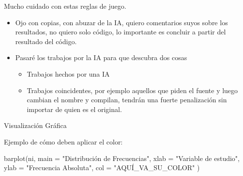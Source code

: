 \documentclass[
  ignorenonframetext,
]{beamer}
\newenvironment{Shaded}{\begin{snugshade}}{\end{snugshade}}
\newcommand{\AttributeTok}[1]{\textcolor[rgb]{0.40,0.45,0.13}{#1}}
\newcommand{\FunctionTok}[1]{\textcolor[rgb]{0.28,0.35,0.67}{#1}}
\newcommand{\NormalTok}[1]{\textcolor[rgb]{0.00,0.23,0.31}{#1}}
\newcommand{\StringTok}[1]{\textcolor[rgb]{0.13,0.47,0.30}{#1}}
\providecommand{\tightlist}{%
  \setlength{\itemsep}{0pt}\setlength{\parskip}{0pt}}
\begin{document}
\begin{frame}{Mucho cuidado con estas reglas de juego.}
\label{mucho-cuidado-con-estas-reglas-de-juego.}
\begin{tcolorbox}[enhanced jigsaw, opacitybacktitle=0.6, toprule=.15mm, opacityback=0, colbacktitle=quarto-callout-caution-color!10!white, colback=white, leftrule=.75mm, bottomrule=.15mm, colframe=quarto-callout-caution-color-frame, titlerule=0mm, coltitle=black, bottomtitle=1mm, breakable, rightrule=.15mm, toptitle=1mm, title=\textcolor{quarto-callout-caution-color}{\faFire}\hspace{0.5em}{Caution}, arc=.35mm, left=2mm]

\begin{itemize}
\item
  Ojo con copias, con abuzar de la IA, quiero comentarios suyos sobre
  los resultados, no quiero solo código, lo importante es concluir a
  partir del resultado del código.
\item
  Pasaré los trabajos por la IA para que descubra dos cosas

  \begin{itemize}
  \tightlist
  \item
    Trabajos hechos por una IA
  \item
    Trabajos coincidentes, por ejemplo aquellos que piden el fuente y
    luego cambian el nombre y compilan, tendrán una fuerte penalización
    sin importar de quien es el original.
  \end{itemize}
\end{itemize}

\end{tcolorbox}
\end{frame}

\begin{frame}[fragile]{Visualización Gráfica}
\label{visualizaciuxf3n-gruxe1fica}
\begin{block}{Ejemplo de cómo deben aplicar el color:}
\label{ejemplo-de-cuxf3mo-deben-aplicar-el-color}
\begin{Shaded}
\begin{Highlighting}[]
\FunctionTok{barplot}\NormalTok{(ni, }
        \AttributeTok{main =} \StringTok{"Distribución de Frecuencias"}\NormalTok{,}
        \AttributeTok{xlab =} \StringTok{"Variable de estudio"}\NormalTok{,}
        \AttributeTok{ylab =} \StringTok{"Frecuencia Absoluta"}\NormalTok{,}
        \AttributeTok{col  =} \StringTok{"AQUÍ\_VA\_SU\_COLOR"}\NormalTok{ )}
\end{Highlighting}
\end{Shaded}
\end{block}
\end{frame}
\end{document}
